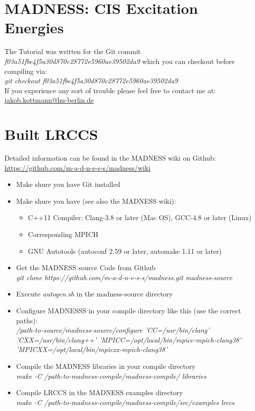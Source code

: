 \documentclass[10pt,a4paper]{scrartcl}
\begin{document}
\section*{MADNESS: CIS Excitation Energies}
The Tutorial was written for the Git commit \textit{f03a51fbe4f5a30d870c28772e5960ae39502da9} which you can checkout before compiling via: \\
\textit{git checkout f03a51fbe4f5a30d870c28772e5960ae39502da9}\\
If you experience any sort of trouble please feel free to contact me at:\\
\href{mailto:jakob.kottmann@hu-berlin.de}{jakob.kottmann@hu-berlin.de}

\section{Built LRCCS}
Detailed information can be found in the MADNESS wiki on Github: \url{https://github.com/m-a-d-n-e-s-s/madness/wiki}
\begin{itemize}
\item Make shure you have Git installed
\item Make shure you have (see also the MADNESS wiki):
\begin{itemize}
\item C++11 Compiler: Clang-3.8 or later (Mac OS), GCC-4.8 or later (Linux)
\item Corresponding MPICH
\item GNU Autotools (autoconf 2.59 or later, automake 1.11 or later)
\end{itemize}
\item Get the MADNESS source Code from Github\\
\textit{git clone {https://github.com/m-a-d-n-e-s-s/madness.git} madness-source}
\item Execute \textit{autogen.sh} in the madness-source directory
\item Configure MADNESSS in your compile directory like this (use the correct paths):\\
\textit{/path-to-source/madness-source/configure 'CC=/usr/bin/clang' 'CXX=/usr/bin/clang++'
'MPICC=/opt/local/bin/mpicc-mpich-clang38' 'MPICXX=/opt/local/bin/mpicxx-mpich-clang38'} 
\item Compile the MADNESS libraries in your compile directory\\
\textit{make -C /path-to-madness-compile/madness-compile/ libraries}
\item Compile LRCCS in the MADNESS examples directory\\
\textit{make -C /path-to-madness-compile/madness-compile/src/examples lrccs}
\end{itemize}
\end{document}
